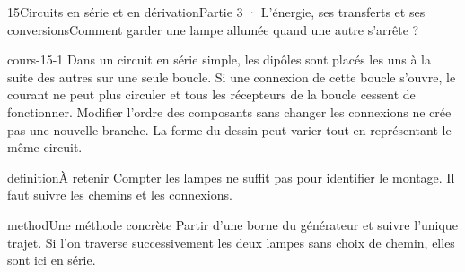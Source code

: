 \documentclass[12pt,twoside,openany]{book}
\begin{document}
\clearpage\pagestyle{otMain}
\begin{ouverture}[college3]{15}{Circuits en série et en dérivation}{Partie 3 · L’énergie, ses transferts et ses conversions}{Comment garder une lampe allumée quand une autre s’arrête ?}
\end{ouverture}
\label{ch-15-cours-1}
\label{ess-15}
\begin{pcFiche}{cours-15-1}
Dans un circuit en série simple, les dipôles sont placés les uns à la suite des autres sur une seule boucle. Si une connexion de cette boucle s’ouvre, le courant ne peut plus circuler et tous les récepteurs de la boucle cessent de fonctionner. Modifier l’ordre des composants sans changer les connexions ne crée pas une nouvelle branche. La forme du dessin peut varier tout en représentant le même circuit.\par
{}
\begin{pcEncadre}{definition}{À retenir}
Compter les lampes ne suffit pas pour identifier le montage. Il faut suivre les chemins et les connexions.\par
\end{pcEncadre}
\begin{pcEncadre}{method}{Une méthode concrète}
Partir d’une borne du générateur et suivre l’unique trajet. Si l’on traverse successivement les deux lampes sans choix de chemin, elles sont ici en série.\par
\end{pcEncadre}
\end{pcFiche}
\label{ch-15-cours-2}
\end{document}
